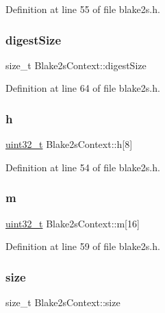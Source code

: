 Definition at line 55 of file blake2s.\+h.

\mbox{\label{structBlake2sContext_af889060008a4abca5aeaa642d9de3e27}} 
\subsubsection{\texorpdfstring{digest\+Size}{digestSize}}
{\footnotesize\ttfamily size\+\_\+t Blake2s\+Context\+::digest\+Size}



Definition at line 64 of file blake2s.\+h.

\mbox{\label{structBlake2sContext_acc8853d757da93c10c7c68a48150a5b7}} 
\subsubsection{\texorpdfstring{h}{h}}
{\footnotesize\ttfamily \hyperlink{stdint_8h_a435d1572bf3f880d55459d9805097f62}{uint32\+\_\+t} Blake2s\+Context\+::h\mbox{[}8\mbox{]}}



Definition at line 54 of file blake2s.\+h.

\mbox{\label{structBlake2sContext_ad27d2ff046f98cc55347641763639aef}} 
\subsubsection{\texorpdfstring{m}{m}}
{\footnotesize\ttfamily \hyperlink{stdint_8h_a435d1572bf3f880d55459d9805097f62}{uint32\+\_\+t} Blake2s\+Context\+::m\mbox{[}16\mbox{]}}



Definition at line 59 of file blake2s.\+h.

\mbox{\label{structBlake2sContext_ab531fb32432b92ca49a83f04e841c0b3}} 
\subsubsection{\texorpdfstring{size}{size}}
{\footnotesize\ttfamily size\+\_\+t Blake2s\+Context\+::size}



